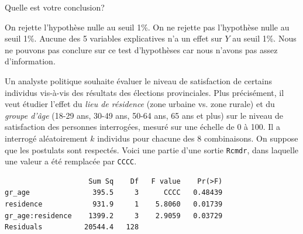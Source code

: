 \begin{questions}
\begin{parts}
\begin{subparts}
    \subpart[1] Quelle est votre conclusion?

    \medskip\begin{checkboxes}
        \CorrectChoice On rejette l'hypothèse nulle au seuil 1\%.
        \choice On ne rejette pas l'hypothèse nulle au seuil 1\%.
        \choice Aucune des 5 variables explicatives n'a un effet sur $Y$ au seuil 1\%. 
        \choice Nous ne pouvons pas conclure sur ce test d'hypothèses car nous n'avons pas assez d'information.
    \end{checkboxes}

\end{subparts}

\end{parts}


\newpage
\question[] 
Un analyste politique souhaite évaluer le niveau de satisfaction de certains individus vis-à-vis des résultats des élections provinciales. Plus précisément, il veut étudier l'effet du \textit{lieu de résidence} (zone urbaine vs. zone rurale) et du \textit{groupe d'âge} (18-29 ans, 30-49 ans, 50-64 ans, 65 ans et plus) sur le niveau de satisfaction des personnes interrogées, mesuré sur une échelle de 0 à 100. Il a interrogé aléatoirement $k$ individus pour chacune des 8 combinaisons. On suppose que les postulats sont respectés. Voici une partie d’une sortie \texttt{Rcmdr}, dans laquelle une valeur a été remplacée par \texttt{CCCC}.
\begin{verbatim}
                    Sum Sq    Df   F value    Pr(>F)  
gr_age               395.5     3      CCCC   0.48439  
residence            931.9     1    5.8060   0.01739 
gr_age:residence    1399.2     3    2.9059   0.03729 
Residuals          20544.4   128 
\end{verbatim}

\end{questions}
